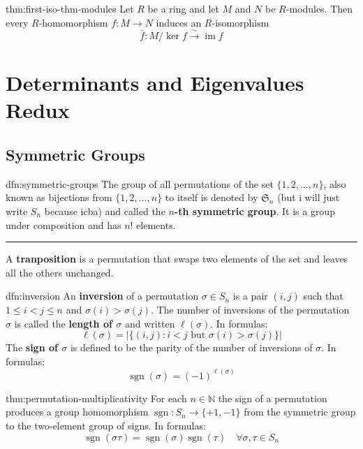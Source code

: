 \documentclass[landscape, 8pt]{extarticle}
\DeclareMathOperator{\im}{im}
\DeclareMathOperator{\sgn}{sgn}
\begin{document}
\begin{multicols}{3}
\begin{thm}{thm:first-iso-thm-modules}{}
    Let $R$ be a ring and let $M$ and $N$ be $R$-modules. Then every $R$-homomorphism $f : M\to N$ induces an $R$-isomorphism
    \[\overline{f} : M / \ker f \xrightarrow{\sim} \im f\]
\end{thm}

\newpage
\section{Determinants and Eigenvalues Redux}

\subsection{Symmetric Groups}

\begin{dfn}{dfn:symmetric-groups}{}
    The group of all permutations of the set $\{1,2,\dots,n\}$, also known as bijections from $\{1,2,\dots,n\}$ to itself is denoted by $\mathfrak{S}_{n}$ (but i will just write $S_{n}$ because icba) and called the \textbf{$n$-th symmetric group}. It is a group under composition and has $n!$ elements.

    \noindent\rule{\textwidth}{0.2pt}
    A \textbf{tranposition} is a permutation that swaps two elements of the set and leaves all the others unchanged.
\end{dfn}

\begin{dfn}{dfn:inversion}{}
    An \textbf{inversion} of a permutation $\sigma\in S_{n}$ is a pair $(i, j)$ such that $1 \le i < j \le n$ and $\sigma(i) > \sigma(j)$. The number of inversions of the permutation $\sigma$ is called the \textbf{length of $\sigma$} and written $\ell(\sigma)$. In formulas:
    \[\ell(\sigma) = \lvert \{(i,j) : i < j \text{ but } \sigma(i) > \sigma(j)\} \rvert\]
    The \textbf{sign of $\sigma$} is defined to be the parity of the number of inversions of $\sigma$. In formulas:
    \[\sgn(\sigma) = (-1)^{\ell(\sigma)}\]
\end{dfn}

\begin{thm}{thm:permutation-multiplicativity}{}
    For each $n\in \mathbb{N}$ the sign of a permutation produces a group homomorphism $\sgn : S_{n} \to \{+1, -1\}$ from the symmetric group to the two-element group of signs. In formulas:
    \[\sgn(\sigma\tau) = \sgn(\sigma)\sgn(\tau) \quad \forall \sigma, \tau\in S_{n}\]
\end{thm}


\end{multicols}
\end{document}
